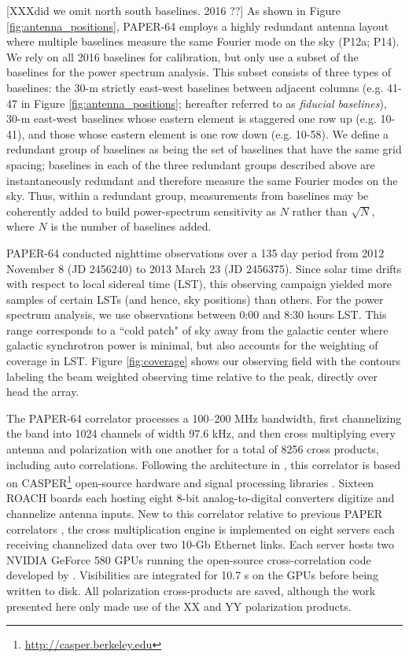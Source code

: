 \documentclass[twocolumn,numberedappendix]{emulateapj} \shorttitle{New Limits on the 21 cm Power Spectrum at $z=8.4$}
\begin{document}
[XXXdid we omit north south baselines. 2016 ??]
As shown in Figure \ref{fig:antenna_positions}, PAPER-64 employs
a highly redundant antenna layout where multiple baselines measure
the same Fourier mode on the sky (P12a; P14).
We rely on all 2016 baselines for calibration,
but only use a subset of the baselines for the power spectrum
analysis. This subset consists of three types of baselines: the 30-m
strictly east-west baselines between adjacent columns (e.g. 41-47
in Figure \ref{fig:antenna_positions}; hereafter referred to 
as {\it fiducial baselines}), 30-m east-west baselines
whose eastern element is staggered one row up (e.g. 10-41), and
those whose eastern element is one row down (e.g. 10-58).
We define a redundant group of
baselines as being the set of baselines that have the same grid spacing;
baselines in each
of the three redundant groups described above are instantaneously redundant and
therefore measure the same Fourier modes on the sky. Thus, within a redundant group,
measurements from baselines may be 
coherently added to build power-spectrum sensitivity as $N$ rather than
$\sqrt{N}$, where $N$ is the number of baselines added.  

PAPER-64 conducted nighttime observations over a 135 day period 
from 2012 November 8 (JD 2456240) to 2013 March 23 (JD 2456375). 
Since solar time drifts with respect to local sidereal time (LST), this observing campaign
yielded more samples of certain LSTs (and hence, sky positions) than others. 
For the power spectrum analysis, we use observations between 0:00 and 8:30 hours
LST.  This range corresponds to
a ``cold patch" of sky away from the galactic center where galactic synchrotron power is minimal,
but also accounts for the weighting of coverage in LST.
Figure \ref{fig:coverage} shows our observing field with the contours labeling
the beam weighted observing time relative to the peak, directly over head the
array.

The PAPER-64 correlator processes a 100--200 MHz bandwidth, first
channelizing the band into 1024 channels of width 97.6 kHz, and then
cross multiplying every antenna and polarization with one another for a total of
8256 cross products, including auto correlations.  Following the architecture 
in \citet{parsons_et_al2008}, this
correlator is based on CASPER\footnote{\url{http://casper.berkeley.edu}} open-source
hardware and signal processing libraries \citep{parsons_et_al2006}.  
Sixteen ROACH boards each hosting eight 8-bit analog-to-digital
converters digitize and channelize antenna inputs. New to this correlator relative to previous PAPER correlators \citep{parsons_et_al2010},
the cross multiplication engine is implemented on eight servers each receiving
channelized data over two 10-Gb Ethernet links.  Each server hosts
two NVIDIA GeForce 580 GPUs running the open-source cross-correlation code developed
by \citet{clark_et_al2013}.
Visibilities are integrated for 10.7 s on the GPUs before
being written to disk.  All polarization cross-products are saved, although the
work presented here only made use of the XX and YY polarization products.
\end{document}
